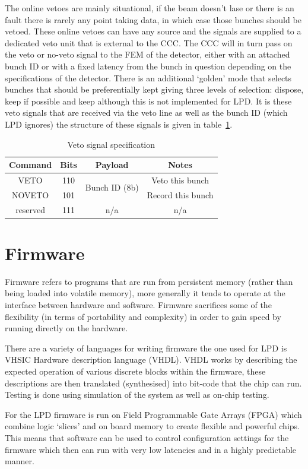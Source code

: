 The online vetoes are mainly situational, if the beam doesn't lase or there is an fault there is rarely any point taking data, in which case those bunches should be vetoed. These online vetoes can have any source and the signals are supplied to a dedicated veto unit that is external to the CCC. The CCC will in turn pass on the veto or no-veto signal to the FEM of the detector, either with an attached bunch ID or with a fixed latency from the bunch in question depending on the specifications of the detector. There is an additional `golden' mode that selects bunches that should be preferentially kept giving three levels of selection: dispose, keep if possible and keep although this is not implemented for LPD. It is these veto signals that are received via the veto line as well as the bunch ID (which LPD ignores) the structure of these signals is given in table~\ref{tab:veto_spec}.

\begin{table}
  \begin{center}
  \begin{tabular}{c|c|c|c}
    Command & Bits & Payload                        & Notes\\
    \hline
    VETO    & 110  & \multirow{2}{*}{Bunch ID (8b)} & Veto this bunch \\
    NOVETO  & 101  &                                & Record this bunch \\
    reserved& 111  & n/a                            & n/a \\
  \end{tabular}
  \end{center}
  \caption{Veto signal specification}
  \label{tab:veto_spec}
\end{table}
\section{Firmware} %
\label{sec:firmware}
Firmware refers to programs that are run from persistent memory (rather than being loaded into volatile memory), more generally it tends to operate at the interface between hardware and software. Firmware sacrifices some of the flexibility (in terms of portability and complexity) in order to gain speed by running directly on the hardware. 

There are a variety of languages for writing firmware the one used for LPD is VHSIC Hardware description language (VHDL). VHDL works by describing the expected operation of various discrete blocks within the firmware, these descriptions are then translated (synthesised) into bit-code that the chip can run. Testing is done using simulation of the system as well as on-chip testing.

For the LPD firmware is run on Field Programmable Gate Arrays (FPGA) which combine logic `slices' and on board memory to create flexible and powerful chips. This means that software can be used to control configuration settings for the firmware which then can run with very low latencies and in a highly predictable manner.

